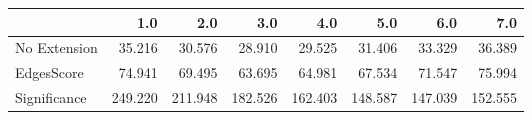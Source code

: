 \begin{tabular}{lrrrrrrr}
\toprule
{} &     1.0 &     2.0 &     3.0 &     4.0 &     5.0 &     6.0 &     7.0 \\
\midrule
No Extension &  35.216 &  30.576 &  28.910 &  29.525 &  31.406 &  33.329 &  36.389 \\
EdgesScore   &  74.941 &  69.495 &  63.695 &  64.981 &  67.534 &  71.547 &  75.994 \\
Significance & 249.220 & 211.948 & 182.526 & 162.403 & 148.587 & 147.039 & 152.555 \\
\bottomrule
\end{tabular}
